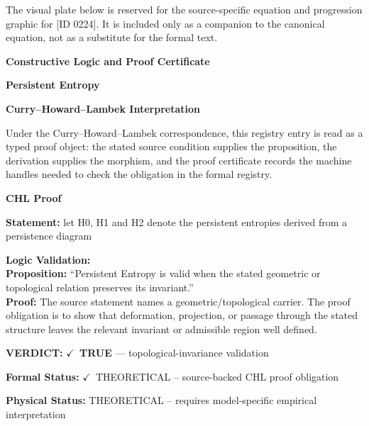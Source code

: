 \begingroup\footnotesize\sloppy
The visual plate below is reserved for the source-specific equation and progression graphic for [ID 0224]. It is included only as a companion to the canonical equation, not as a substitute for the formal text.
\par\endgroup
\ifTZPDarkEdition
{}
\fi

\clearpage
\begingroup\tzpsupportsetup
\noindent\textbf{\fontsize{10.8pt}{12.8pt}\selectfont [ID 0224] Constructive Logic and Proof Certificate}\par
\noindent\textbf{\fontsize{10pt}{12pt}\selectfont Persistent Entropy}\par
\vspace{0.45em}
\begingroup
\footnotesize
\setlength{\parskip}{0.22em}
\setlength{\parindent}{0pt}
\noindent\textbf{Curry--Howard--Lambek Interpretation}\par
Under the Curry--Howard--Lambek correspondence, this registry entry is read as a typed proof
object: the stated source condition supplies the proposition, the derivation supplies the
morphism, and the proof certificate records the machine handles needed to check the obligation
in the formal registry.

\vspace{0.45em}
\noindent\textbf{CHL Proof}\par
\textbf{Statement:} let H0, H1 and H2 denote the persistent entropies derived from a persistence diagram

\textbf{Logic Validation:}\\
\textbf{Proposition:} ``Persistent Entropy is valid when the stated geometric or topological relation preserves
its invariant.''\\
\textbf{Proof:} The source statement names a geometric/topological carrier. The proof obligation is to
show that deformation, projection, or passage through the stated structure leaves the
relevant invariant or admissible region well defined.

\textbf{VERDICT:} \ensuremath{\checkmark}\ \textbf{TRUE} --- topological-invariance validation

\textbf{Formal Status:} \ensuremath{\checkmark}\ THEORETICAL -- source-backed CHL proof obligation

\textbf{Physical Status:} THEORETICAL -- requires model-specific empirical interpretation
\par\vspace{0.45em}
\par
\ifTZPDarkEdition
{}
\fi
\endgroup
\endgroup
